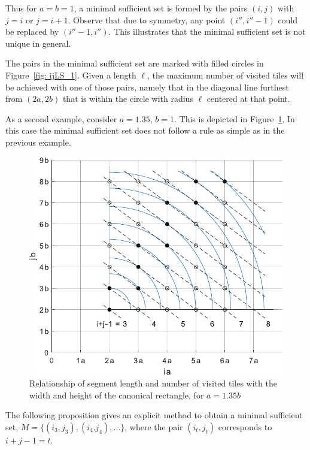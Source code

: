 \documentclass[12pt, a4paper]{article}
\newcommand{\len}{\ell} %
\newcommand{\tiles}{t} %
\newcommand{\mss}{M}
\begin{document}
Thus for $a=b=1$, a minimal sufficient set is formed by the pairs $(i,j)$ with $j=i$ or $j=i+1$. Observe that due to symmetry, any point $(i'',i''-1)$ could be replaced by $(i''-1,i'')$. This illustrates that the minimal sufficient set is not unique in general. 

The pairs in the minimal sufficient set are marked with filled circles in Figure~\ref{fig: ijLS_1}. Given a length $\len$, the maximum number of visited tiles will be achieved with one of those pairs, namely that in the diagonal line furthest from $(2a,2b)$ that is within the circle with radius $\len$ centered at that point.

As a second example, consider $a=1.35$, $b=1$. This is depicted in Figure~\ref{fig: ijLS_1p35}. In this case the minimal sufficient set does not follow a rule as simple as in the previous example.

\begin{figure}
\centering%
\includegraphics[width=.7\textwidth]{ijLS_1p35}%
\caption{Relationship of segment length and number of visited tiles with the width and height of the canonical rectangle, for $a=1.35b$
}%
\label{fig: ijLS_1p35}%
\end{figure}%

The following proposition gives an explicit method to obtain a minimal sufficient set, $\mss = \{(i_3,j_3), (i_4.j_4), \ldots\}$, where the pair $(i_\tiles,j_\tiles)$ corresponds to $i+j-1 = \tiles$.
\end{document}
